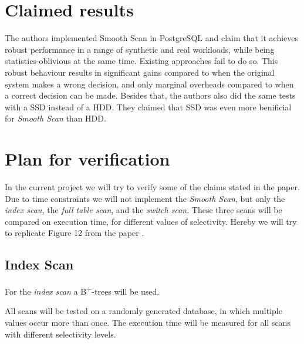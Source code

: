 \documentclass[a4paper,11pt,titlepage]{article}
\begin{document}
\section{Claimed results}
The authors implemented Smooth Scan in PostgreSQL and claim that it achieves robust performance in a range of synthetic and real workloads, while being statistics-oblivious at the same time. Existing approaches fail to do so. This robust behaviour results in significant gains compared to when the original system makes a wrong decision, and only marginal overheads compared to when a correct decision can be made. Besides that, the authors also did the same tests with a SSD instead of a HDD. They claimed that SSD was even more benificial for \emph{Smooth Scan} than HDD.

\section{Plan for verification}
In the current project we will try to verify some of the claims stated in the paper. 
Due to time constraints we will not implement the \emph{Smooth Scan}, but only the \emph{index scan}, the \emph{full table scan}, and the \emph{switch scan}. 
These three scans will be compared on execution time, for different values of selectivity. 
Hereby we will try to replicate Figure 12 from the paper \cite{smoothscan}.

\subsection{Index Scan}
For the \emph{index scan} a B\textsuperscript{+}-trees will be used.

All scans will be tested on a randomly generated database, in which multiple values occur more than once. 
The execution time will be measured for all scans with different selectivity levels. 
\end{document}

